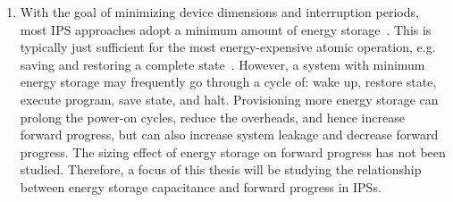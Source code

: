 \begin{enumerate}

\item 
With the goal of minimizing device dimensions and interruption periods, most IPS approaches adopt a minimum amount of energy storage~\cite{balsamo2016hibernus++, 10.1145/2700249, 10.1145/2809695.2809707, 10.1145/3281300, 222579}. 
This is typically just sufficient for the most energy-expensive atomic operation, e.g. saving and restoring a complete state~\cite{balsamo2015hibernus}. 
However, a system with minimum energy storage may frequently go through a cycle of: wake up, restore state, execute program, save state, and halt. 
Provisioning more energy storage can prolong the power-on cycles, reduce the overheads, and hence increase forward progress, but can also increase system leakage and decrease forward progress. 
The sizing effect of energy storage on forward progress has not been studied. 
Therefore, a focus of this thesis will be studying the relationship between energy storage capacitance and forward progress in IPSs. 


\end{enumerate}

